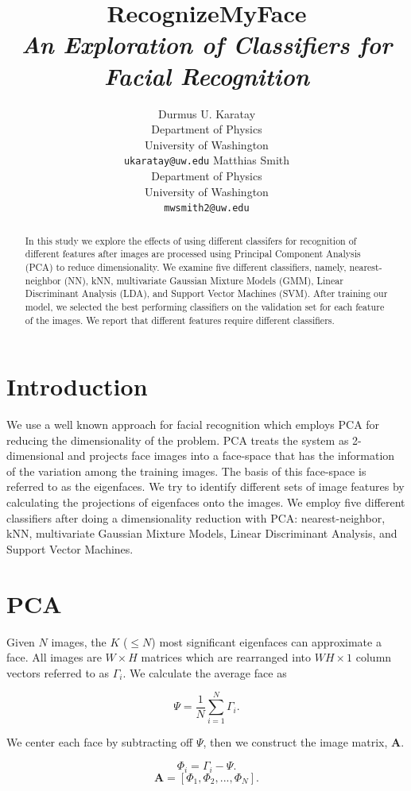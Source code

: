 \documentclass{article} %
\title{RecognizeMyFace\\
\textit{An Exploration of Classifiers for Facial Recognition}}
\author{
Durmus U. Karatay \\
Department of Physics \\
University of Washington \\
\texttt{ukaratay@uw.edu}
\And
Matthias Smith \\ 
Department of Physics \\
University of Washington \\
\texttt{mwsmith2@uw.edu}
}
\begin{document}
\maketitle

\begin{abstract}
In this study we explore the effects of using different classifers for recognition of different features after images are processed using Principal Component Analysis (PCA) to reduce dimensionality. We examine five different classifiers, namely, nearest-neighbor (NN), kNN, multivariate Gaussian Mixture Models (GMM), Linear Discriminant Analysis (LDA), and Support Vector Machines (SVM).  After training our model, we selected the best performing classifiers on the validation set for each feature of the images.  We report that different features require different classifiers.
\end{abstract}

\section{Introduction}

We use a well known approach for facial recognition which employs PCA for reducing the dimensionality of the problem.  PCA treats the system as 2-dimensional and projects face images into a face-space that has the information of the variation among the training images. The basis of this face-space is referred to as the eigenfaces.  We try to identify different sets of image features by calculating the projections of eigenfaces onto the images.  We employ five different classifiers after doing a dimensionality reduction with PCA: nearest-neighbor, kNN, multivariate Gaussian Mixture Models, Linear Discriminant Analysis, and Support Vector Machines.

\section{PCA}

Given $N$ images, the $K$ ($\leq N$) most significant eigenfaces can approximate a face. All images are $W \times H$ matrices which are rearranged into $W H \times 1$ column vectors referred to as $\Gamma_i$.  We calculate the average face as

\[
	\Psi = \frac{1}{N} \sum_{i = 1}^{N} \Gamma_i.
\]

We center each face by subtracting off $\Psi$, then we construct the image matrix, $\mathbf{A}$.

\[ 
	\Phi_i = \Gamma_i - \Psi.
\]
\[
	\mathbf{A} = \left[ \Phi_1, \Phi_2, ..., \Phi_N \right].
\]
\end{document}
